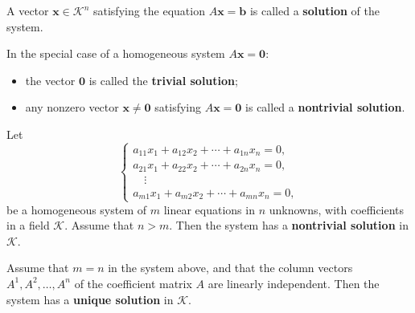\begin{definitionenv}
	A vector $\bm{x} \in \mathcal{K}^n$ satisfying the equation $A\bm{x} = \bm{b}$ is called a \textbf{solution} of the system.

	In the special case of a homogeneous system $A\bm{x} = \bm{0}$:
	\begin{itemize}
		\item the vector $\bm{0}$ is called the \textbf{trivial solution};
		\item any nonzero vector $\bm{x} \neq \bm{0}$ satisfying $A\bm{x} = \bm{0}$ is called a \textbf{nontrivial solution}.
	\end{itemize}
\end{definitionenv}

\begin{theoremenv}
	Let
	\[
	\begin{cases}
		a_{11}x_1 + a_{12}x_2 + \cdots + a_{1n}x_n = 0,\\
		a_{21}x_1 + a_{22}x_2 + \cdots + a_{2n}x_n = 0,\\
		\quad \vdots \\
		a_{m1}x_1 + a_{m2}x_2 + \cdots + a_{mn}x_n = 0,
	\end{cases}
	\]
	be a homogeneous system of $m$ linear equations in $n$ unknowns, with coefficients in a field $\mathcal{K}$.
	Assume that $n > m$.
	Then the system has a \textbf{nontrivial solution} in $\mathcal{K}$.
\end{theoremenv}

\begin{theoremenv}
	Assume that $m = n$ in the system above, and that the column vectors
	$A^1, A^2, \dots, A^n$ of the coefficient matrix $A$ are linearly independent.
	Then the system has a \textbf{unique solution} in $\mathcal{K}$.
\end{theoremenv}

\newpage